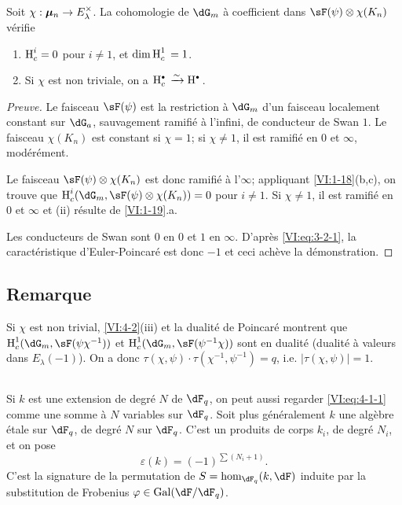 \begin{proposition_}\label{VI:4-3}
Soit $\chi:{\bm\mu}_n \to E_\lambda^\times$. La cohomologie de $\dG_m$ \`a 
coefficient dans $\sF(\psi)\otimes \chi(K_n)$ v\'erifie 
\begin{enumerate}[\indent (i)]
  \item $\operatorname{H}_c^i=0$ pour $i\ne 1$, et $\dim \operatorname{H}_c^1{} = 1$. 
  \item Si $\chi$ est non triviale, on a $\h_c^\bullet{}\iso \h^\bullet{}$. 
\end{enumerate}
\end{proposition_}
\begin{proof}[Preuve]
Le faisceau $\sF(\psi)$ est la restriction \`a $\dG_m$ d'un faisceau localement 
constant sur $\dG_a$, sauvagement ramifi\'e \`a l'infini, de conducteur de 
Swan $1$. Le faisceau $\chi(K_n)$ est constant si $\chi=1$; si $\chi\ne 1$, il 
est ramifi\'e en $0$ et $\infty$, mod\'er\'ement. 

Le faisceau $\sF(\psi)\otimes\chi(K_n)$ est donc ramifi\'e \`a l'$\infty$; 
appliquant \ref{VI:1-18}(b,c), on trouve que 
$\h_c^i(\dG_m,\sF(\psi)\otimes \chi(K_n))=0$ pour $i\ne 1$. Si $\chi\ne 1$, il 
est ramifi\'e en $0$ et $\infty$ et (ii) r\'esulte de \ref{VI:1-19}.a. 

Les conducteurs de Swan sont $0$ en $0$ et $1$ en $\infty$. D'apr\`es 
\eqref{VI:eq:3-2-1}, la caract\'eristique d'Euler-Poincar\'e est donc $-1$ et 
ceci ach\`eve la d\'emonstration. 
\end{proof}





\subsection{Remarque}\label{VI:4-4}

Si $\chi$ est non trivial, \ref{VI:4-2}(iii) et la dualit\'e de Poincar\'e 
montrent que $\h_c^1(\dG_m,\sF(\psi\chi^{-1}))$ et 
$\h_c^1(\dG_m,\sF(\psi^{-1}\chi))$ sont en dualit\'e (dualit\'e \`a valeurs 
dans $E_\lambda(-1)$). On a donc 
$\tau(\chi,\psi)\cdot \tau(\chi^{-1},\psi^{-1}) = q$, i.e. 
$|\tau(\chi,\psi)|=1$. 





\subsection{}\label{VI:4-5}

Si $k$ est une extension de degr\'e $N$ de $\dF_q$, on peut aussi regarder 
\eqref{VI:eq:4-1-1} comme une somme \`a $N$ variables sur $\dF_q$. Soit plus 
g\'en\'eralement $k$ une alg\`ebre \'etale sur $\dF_q$, de degr\'e $N$ sur 
$\dF_q$. C'est un produits de corps $k_i$, de degr\'e $N_i$, et on pose 
\begin{equation*}\tag{4.5.1}\label{VI:eq:4-5-1}
  \varepsilon(k) = (-1)^{\sum (N_i+1)} \text{.} 
\end{equation*}
C'est la signature de la permutation de $S=\hom_{\dF_q}(k,\dF)$ induite par la 
substitution de Frobenius $\varphi\in \gal(\dF/\dF_q)$. 

